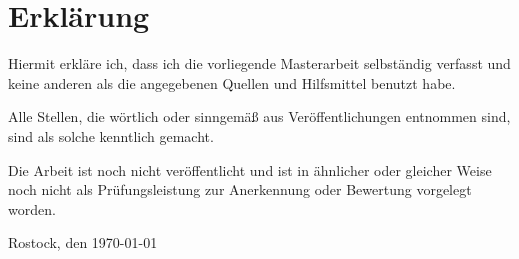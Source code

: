\chapter*{Erklärung}
Hiermit erkläre ich, dass ich die vorliegende Masterarbeit selbständig verfasst und keine anderen als die angegebenen Quellen und Hilfsmittel benutzt habe.

Alle Stellen, die wörtlich oder sinngemäß aus Veröffentlichungen entnommen sind, sind als solche kenntlich gemacht.

Die Arbeit ist noch nicht veröffentlicht und ist in ähnlicher oder gleicher Weise noch nicht als Prüfungsleistung zur Anerkennung oder Bewertung vorgelegt worden.

Rostock, den \today
\\
 \\
\\
\begin{Form}
\end{Form}